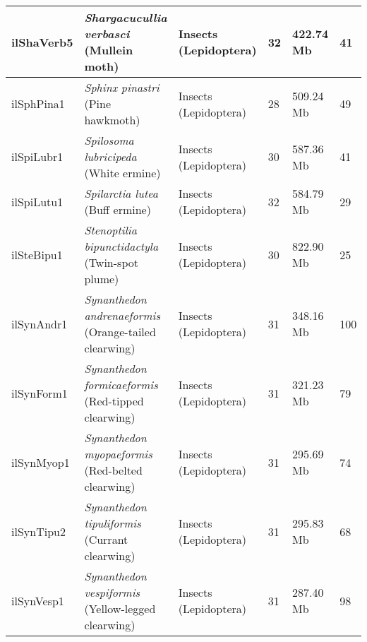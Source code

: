 \begin{centering}
\begin{longtable}{l|l|l|l|l|l}
ilShaVerb5 & \makecell[{l}]{\textit{Shargacucullia verbasci} \\ (Mullein moth)} & \makecell[{l}]{Insects \\ (Lepidoptera)} & 32 & 422.74 Mb & 41  \\ \hline
ilSphPina1 & \makecell[{l}]{\textit{Sphinx pinastri} \\ (Pine hawkmoth)} & \makecell[{l}]{Insects \\ (Lepidoptera)} & 28 & 509.24 Mb & 49  \\ \hline
ilSpiLubr1 & \makecell[{l}]{\textit{Spilosoma lubricipeda} \\ (White ermine)} & \makecell[{l}]{Insects \\ (Lepidoptera)} & 30 & 587.36 Mb & 41  \\ \hline
ilSpiLutu1 & \makecell[{l}]{\textit{Spilarctia lutea} \\ (Buff ermine)} & \makecell[{l}]{Insects \\ (Lepidoptera)} & 32 & 584.79 Mb & 29  \\ \hline
ilSteBipu1 & \makecell[{l}]{\textit{Stenoptilia bipunctidactyla} \\ (Twin-spot plume)} & \makecell[{l}]{Insects \\ (Lepidoptera)} & 30 & 822.90 Mb & 25  \\ \hline
ilSynAndr1 & \makecell[{l}]{\textit{Synanthedon andrenaeformis} \\ (Orange-tailed clearwing)} & \makecell[{l}]{Insects \\ (Lepidoptera)} & 31 & 348.16 Mb & 100  \\ \hline
ilSynForm1 & \makecell[{l}]{\textit{Synanthedon formicaeformis} \\ (Red-tipped clearwing)} & \makecell[{l}]{Insects \\ (Lepidoptera)} & 31 & 321.23 Mb & 79  \\ \hline
ilSynMyop1 & \makecell[{l}]{\textit{Synanthedon myopaeformis} \\ (Red-belted clearwing)} & \makecell[{l}]{Insects \\ (Lepidoptera)} & 31 & 295.69 Mb & 74  \\ \hline
ilSynTipu2 & \makecell[{l}]{\textit{Synanthedon tipuliformis} \\ (Currant clearwing)} & \makecell[{l}]{Insects \\ (Lepidoptera)} & 31 & 295.83 Mb & 68  \\ \hline
ilSynVesp1 & \makecell[{l}]{\textit{Synanthedon vespiformis} \\ (Yellow-legged clearwing)} & \makecell[{l}]{Insects \\ (Lepidoptera)} & 31 & 287.40 Mb & 98  \\ \hline

\end{longtable}
\end{centering}
